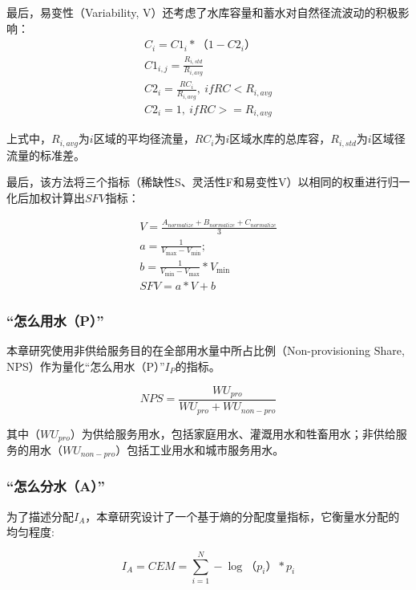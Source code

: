 最后，易变性（Variability, V）还考虑了水库容量和蓄水对自然径流波动的积极影响：
\begin{gather}
    C_i = C1_i * （1 - C2_i） \\
    C1_{i, j} = \frac{R_{i, std}}{R_{i, avg}} \\
    C2_{i} = \frac{RC_{i}}{R_{i, avg}}, \ if RC < R_{i, avg} \\
    C2_{i} = 1, \ if RC >= R_{i, avg}
\end{gather}

上式中，$R_{i, avg}$为$i$区域的平均径流量，$RC_i$为$i$区域水库的总库容，$R_{i, std}$为$i$区域径流量的标准差。

最后，该方法将三个指标（稀缺性S、灵活性F和易变性V）以相同的权重进行归一化后加权计算出$SFV$指标：

\begin{gather}
    V = \frac{A_{normalize} + B_{normalize} + C_{normalize}}{3}\\
    a = \frac{1}{V_{\max} - V_{\min}};\\
    b = \frac{1}{V_{\min} - V_{\max}} * V_{\min}\\
    SFV = a * V + b
\end{gather}


\subsubsection*{“怎么用水（P）”}

本章研究使用非供给服务目的在全部用水量中所占比例（Non-provisioning Share, NPS）作为量化“怎么用水（P）”$I_P$的指标。

\begin{equation}
    NPS = \frac{WU_{pro}}{WU_{pro} + WU_{non-pro}}
\end{equation}

其中（$WU_{pro}$）为供给服务用水，包括家庭用水、灌溉用水和牲畜用水；非供给服务的用水（$WU_{non-pro}$）包括工业用水和城市服务用水。

\subsubsection*{“怎么分水（A）”}

为了描述分配$I_A$，本章研究设计了一个基于熵的分配度量指标，它衡量水分配的均匀程度:

\begin{equation}
    I_A = CEM = \sum_{i=1}^N - \log（p_{i}） * p_{i}
\end{equation}

